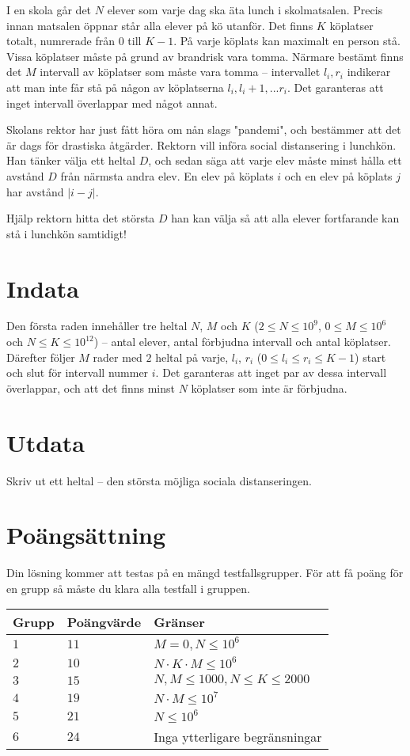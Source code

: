 
I en skola går det $N$ elever som varje dag ska äta lunch i skolmatsalen.
Precis innan matsalen öppnar står alla elever på kö utanför.
Det finns $K$ köplatser totalt, numrerade från $0$ till $K-1$.
På varje köplats kan maximalt en person stå.
Vissa köplatser måste på grund av brandrisk vara tomma.
Närmare bestämt finns det $M$ intervall av köplatser som måste vara tomma --
intervallet $l_i,r_i$ indikerar att man inte får stå på någon av köplatserna $l_i,l_i+1,...r_i$.
Det garanteras att inget intervall överlappar med något annat.

Skolans rektor har just fått höra om nån slags "pandemi", och bestämmer att det är dags för drastiska åtgärder.
Rektorn vill införa social distansering i lunchkön.
Han tänker välja ett heltal $D$, och sedan säga att varje elev måste minst hålla ett avstånd $D$ från närmsta andra elev.
En elev på köplats $i$ och en elev på köplats $j$ har avstånd $|i-j|$.

Hjälp rektorn hitta det största $D$ han kan välja så att alla elever fortfarande kan stå i lunchkön samtidigt!


\section*{Indata}
Den första raden innehåller tre heltal $N$, $M$ och $K$ ($2 \leq N \leq 10^9$, $0 \leq M \leq 10^6$ och $N \leq K \leq 10^{12}$) --
antal elever, antal förbjudna intervall och antal köplatser.
Därefter följer $M$ rader med $2$ heltal på varje, $l_i$, $r_i$  ($0 \le l_i \le r_i \le K-1$) start och slut för intervall nummer $i$.
Det garanteras att inget par av dessa intervall överlappar, och att det finns minst $N$ köplatser som inte är förbjudna.

\section*{Utdata}
Skriv ut ett heltal -- den största möjliga sociala distanseringen. 
\section*{Poängsättning}
Din lösning kommer att testas på en mängd testfallsgrupper.
För att få poäng för en grupp så måste du klara alla testfall i gruppen.

\noindent
\begin{tabular}{| l | l | l |}
  \hline
  Grupp & Poängvärde & Gränser \\ \hline
  $1$    & $11$      &  $M = 0, N \leq 10^6$ \\ \hline
  $2$    & $10$      &  $N \cdot K \cdot M \leq 10^6$ \\ \hline
  $3$    & $15$      &  $N, M \leq 1000, N \leq K \leq 2000$ \\ \hline
  $4$    & $19$      &  $N \cdot M \leq 10^7$ \\ \hline
  $5$    & $21$      &  $N \leq 10^6 $ \\ \hline
  $6$    & $24$      &  Inga ytterligare begränsningar \\ \hline
\end{tabular}
